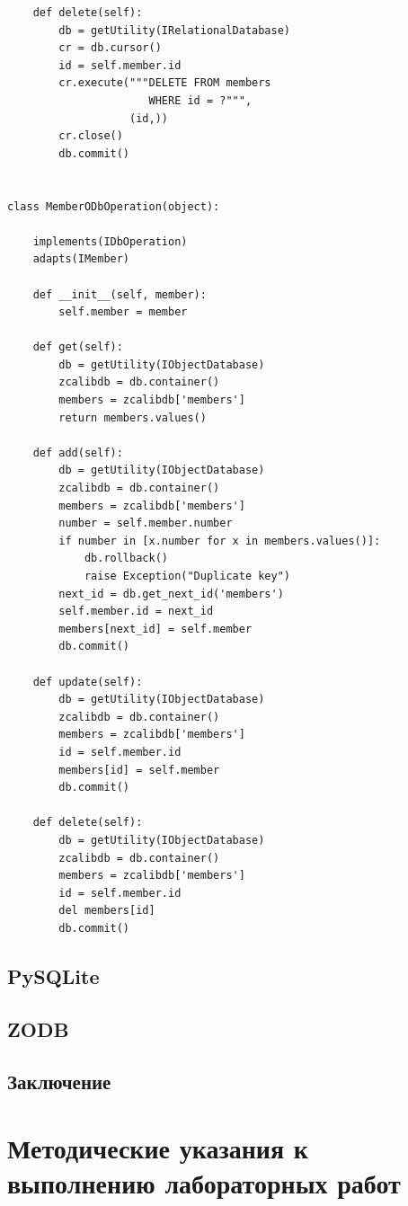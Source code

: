 \documentclass[a4paper,openany,twoside,draft]{book}
\begin{document}
\begin{verbatim}
    def delete(self):
        db = getUtility(IRelationalDatabase)
        cr = db.cursor()
        id = self.member.id
        cr.execute("""DELETE FROM members
                      WHERE id = ?""",
                   (id,))
        cr.close()
        db.commit()


class MemberODbOperation(object):

    implements(IDbOperation)
    adapts(IMember)

    def __init__(self, member):
        self.member = member

    def get(self):
        db = getUtility(IObjectDatabase)
        zcalibdb = db.container()
        members = zcalibdb['members']
        return members.values()

    def add(self):
        db = getUtility(IObjectDatabase)
        zcalibdb = db.container()
        members = zcalibdb['members']
        number = self.member.number
        if number in [x.number for x in members.values()]:
            db.rollback()
            raise Exception("Duplicate key")
        next_id = db.get_next_id('members')
        self.member.id = next_id
        members[next_id] = self.member
        db.commit()

    def update(self):
        db = getUtility(IObjectDatabase)
        zcalibdb = db.container()
        members = zcalibdb['members']
        id = self.member.id
        members[id] = self.member
        db.commit()

    def delete(self):
        db = getUtility(IObjectDatabase)
        zcalibdb = db.container()
        members = zcalibdb['members']
        id = self.member.id
        del members[id]
        db.commit()
\end{verbatim}


\section{PySQLite%
  \label{pysqlite}%
}


\section{ZODB%
  \label{zodb}%
}

\newpage{}
\section{Заключение%
  \label{id53}%
}

\clearpage
\chapter{Методические указания к выполнению лабораторных работ}
\label{cha:labs}
\end{document}
